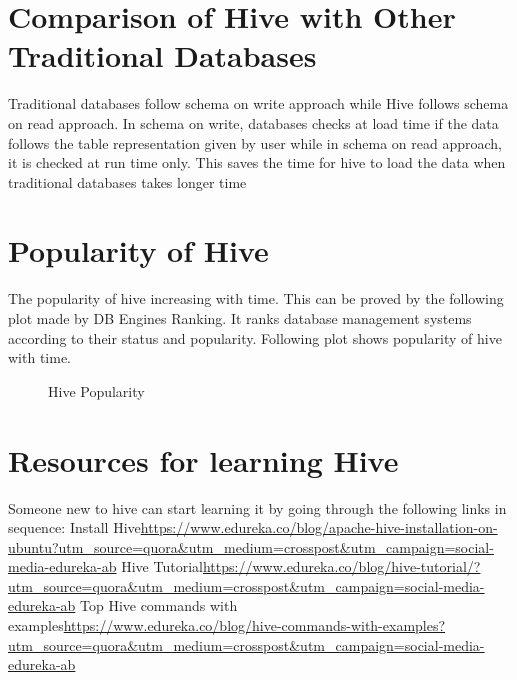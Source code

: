 \documentclass[9pt,twocolumn,twoside]{../../styles/osajnl}
\begin{document}
\section{Comparison of Hive with Other Traditional Databases}
Traditional databases follow schema on write approach while Hive follows schema on read approach. In schema on write, databases checks at load time if the data follows the table representation given by user while in schema on read approach, it is checked at run time only. This saves the time for hive to load the data when traditional databases takes longer time\cite{p2}

\section{Popularity of Hive}
The popularity of hive increasing with time. This can be proved by the following plot made by DB Engines Ranking. It ranks database management systems according to their status and popularity.
Following plot shows popularity of hive with time.

\begin{figure}[htbp]
	\centering
	\caption{Hive Popularity}
	\label{fig:HivePopularity}
\end{figure}
\cite{rank}

\section{Resources for learning Hive}
Someone new to hive can start learning it by going through the following links in sequence:
Install Hive\url{https://www.edureka.co/blog/apache-hive-installation-on-ubuntu?utm_source=quora&utm_medium=crosspost&utm_campaign=social-media-edureka-ab}\newline
Hive Tutorial\url{https://www.edureka.co/blog/hive-tutorial/?utm_source=quora&utm_medium=crosspost&utm_campaign=social-media-edureka-ab}\newline
Top Hive commands with examples\url{https://www.edureka.co/blog/hive-commands-with-examples?utm_source=quora&utm_medium=crosspost&utm_campaign=social-media-edureka-ab}\newline
\end{document}
